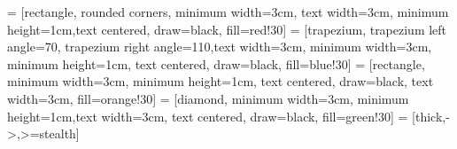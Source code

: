 \usepackage{tikz}
\usetikzlibrary{shapes.geometric, arrows}
 = [rectangle, rounded corners, minimum width=3cm, text width=3cm, minimum height=1cm,text centered, draw=black, fill=red!30]
 = [trapezium, trapezium left angle=70, trapezium right angle=110,text width=3cm, minimum width=3cm, minimum height=1cm, text centered, draw=black, fill=blue!30]
 = [rectangle, minimum width=3cm, minimum height=1cm, text centered, draw=black, text width=3cm, fill=orange!30]
 = [diamond, minimum width=3cm, minimum height=1cm,text width=3cm, text centered, draw=black, fill=green!30]
 = [thick,->,>=stealth]


